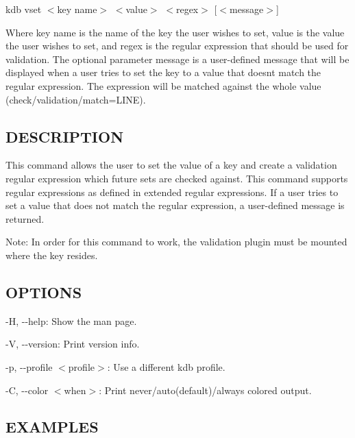 {\ttfamily kdb vset $<$key name$>$ $<$value$>$ $<$regex$>$ \mbox{[}$<$message$>$\mbox{]}}

Where {\ttfamily key name} is the name of the key the user wishes to set, {\ttfamily value} is the value the user wishes to set, and {\ttfamily regex} is the regular expression that should be used for validation. The optional parameter {\ttfamily message} is a user-\/defined message that will be displayed when a user tries to set the key to a value that doesn\textquotesingle{}t match the regular expression. The expression will be matched against the whole value ({\ttfamily check/validation/match=L\+I\+NE}).

\subsection*{D\+E\+S\+C\+R\+I\+P\+T\+I\+ON}

This command allows the user to set the value of a key and create a validation regular expression which future sets are checked against. This command supports regular expressions as defined in extended regular expressions. If a user tries to set a value that does not match the regular expression, a user-\/defined message is returned.

Note\+: In order for this command to work, the {\ttfamily validation} plugin must be mounted where the key resides.

\subsection*{O\+P\+T\+I\+O\+NS}


\begin{DoxyItemize}
\item {\ttfamily -\/H}, {\ttfamily -\/-\/help}\+: Show the man page.
\item {\ttfamily -\/V}, {\ttfamily -\/-\/version}\+: Print version info.
\item {\ttfamily -\/p}, {\ttfamily -\/-\/profile $<$profile$>$}\+: Use a different kdb profile.
\item {\ttfamily -\/C}, {\ttfamily -\/-\/color $<$when$>$}\+: Print never/auto(default)/always colored output.
\end{DoxyItemize}

\subsection*{E\+X\+A\+M\+P\+L\+ES}


